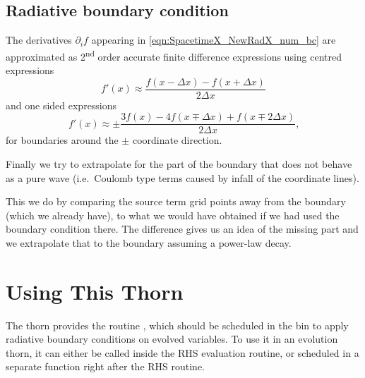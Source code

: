 %

\subsection{Radiative boundary condition}
The derivatives $\partial_i f$ appearing in
\eqref{eqn:SpacetimeX_NewRadX_num_bc} are approximated as
2\textsuperscript{nd} order accurate finite difference expressions using
centred expressions
\begin{equation}
f'(x) \approx \frac{f(x-\Delta x) - f(x+\Delta x)}{2\Delta x}
\end{equation}
and one sided expressions
\begin{equation}
f'(x) \approx \pm\frac{3 f(x) - 4 f(x\mp\Delta x) + f(x\mp2\Delta
x)}{2\Delta x}\mbox{,}
\end{equation}
for boundaries around the $\pm$ coordinate direction.

Finally we try to extrapolate for the part of the boundary
that does not behave as a pure wave (i.e.\ Coulomb type
terms caused by infall of the coordinate lines).

This we do by comparing the source term  grid points
away from the boundary (which we already have), to what
we would have obtained if we had used the boundary
condition there. The difference gives us an idea of the
missing part and we extrapolate that to the boundary
assuming a power-law decay.

\section{Using This Thorn}
The thorn provides the routine , which should be scheduled
in the  bin to apply radiative boundary conditions on
evolved variables.  To use it in an evolution thorn, it can either be called
inside the RHS evaluation routine, or scheduled in a separate function right
after the RHS routine.

